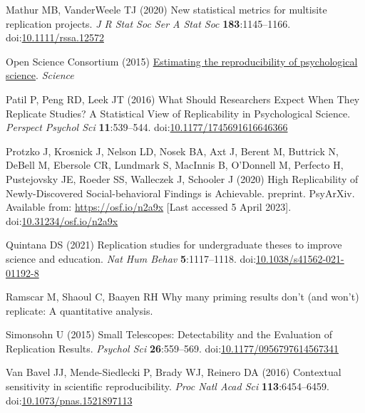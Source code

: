 \documentclass[
  english,
  a4paper,
]{article}
\newlength{\cslhangindent}
\newlength{\cslentryspacingunit} %
\newenvironment{CSLReferences}[2] %
 {%
  \setlength{\parindent}{0pt}
  \ifodd #1
  \let\oldpar\par
  \def\par{\hangindent=\cslhangindent\oldpar}
  \fi
  \setlength{\parskip}{#2\cslentryspacingunit}
 }%
 {}
\begin{document}
\begin{CSLReferences}{1}{0}
\leavevmode{}%
Mathur MB, VanderWeele TJ (2020) New statistical metrics for multisite replication projects. \emph{J R Stat Soc Ser A Stat Soc} \textbf{183}:1145--1166. doi:\href{https://doi.org/10.1111/rssa.12572}{10.1111/rssa.12572}

\leavevmode{}%
Open Science Consortium (2015) \href{https://www.science.org/doi/full/10.1126/science.aac4716?casa_token=IJ35TwwlcjsAAAAA\%3AqiP68QbVAHleIg9zD3WugKWuV6Oa5rswS0VQnDsCq5I14ME4WIQabNGVD_T6SBSuAt6voVHNnWc0sw}{Estimating the reproducibility of psychological science}. \emph{Science}

\leavevmode{}%
Patil P, Peng RD, Leek JT (2016) What {Should Researchers Expect When They Replicate Studies}? {A Statistical View} of {Replicability} in {Psychological Science}. \emph{Perspect Psychol Sci} \textbf{11}:539--544. doi:\href{https://doi.org/10.1177/1745691616646366}{10.1177/1745691616646366}

\leavevmode{}%
Protzko J, Krosnick J, Nelson LD, Nosek BA, Axt J, Berent M, Buttrick N, DeBell M, Ebersole CR, Lundmark S, MacInnis B, O'Donnell M, Perfecto H, Pustejovsky JE, Roeder SS, Walleczek J, Schooler J (2020) High {Replicability} of {Newly-Discovered Social-behavioral Findings} is {Achievable}. preprint. {PsyArXiv}. Available from: \url{https://osf.io/n2a9x} {[}Last accessed 5 April 2023{]}. doi:\href{https://doi.org/10.31234/osf.io/n2a9x}{10.31234/osf.io/n2a9x}

\leavevmode{}%
Quintana DS (2021) Replication studies for undergraduate theses to improve science and education. \emph{Nat Hum Behav} \textbf{5}:1117--1118. doi:\href{https://doi.org/10.1038/s41562-021-01192-8}{10.1038/s41562-021-01192-8}

\leavevmode{}%
Ramscar M, Shaoul C, Baayen RH Why many priming results don't (and won't) replicate: {A} quantitative analysis.

\leavevmode{}%
Simonsohn U (2015) Small {Telescopes}: {Detectability} and the {Evaluation} of {Replication Results}. \emph{Psychol Sci} \textbf{26}:559--569. doi:\href{https://doi.org/10.1177/0956797614567341}{10.1177/0956797614567341}

\leavevmode{}%
Van Bavel JJ, Mende-Siedlecki P, Brady WJ, Reinero DA (2016) Contextual sensitivity in scientific reproducibility. \emph{Proc Natl Acad Sci} \textbf{113}:6454--6459. doi:\href{https://doi.org/10.1073/pnas.1521897113}{10.1073/pnas.1521897113}


\end{CSLReferences}
\end{document}
